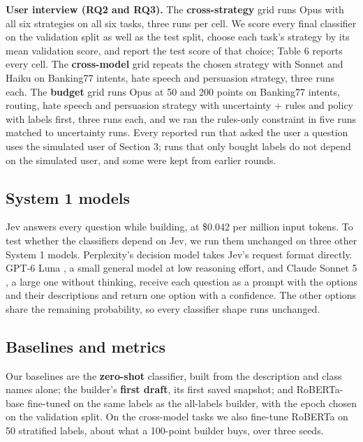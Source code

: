 \documentclass[11pt]{article}
\begin{document}
\textbf{User interview (RQ2 and RQ3).} The \textbf{cross-strategy} grid runs Opus with all six strategies on all six tasks, three runs per cell. We score every final classifier on the validation split as well as the test split, choose each task's strategy by its mean validation score, and report the test score of that choice; Table 6 reports every cell. The \textbf{cross-model} grid repeats the chosen strategy with Sonnet and Haiku on Banking77 intents, hate speech and persuasion strategy, three runs each. The \textbf{budget} grid runs Opus at 50 and 200 points on Banking77 intents, routing, hate speech and persuasion strategy with uncertainty + rules and policy with labels first, three runs each, and we ran the rules-only constraint in five runs matched to uncertainty runs. Every reported run that asked the user a question uses the simulated user of Section 3; runs that only bought labels do not depend on the simulated user, and some were kept from earlier rounds.

\subsection{System 1 models}

Jev answers every question while building, at \$0.042 per million input tokens. To test whether the classifiers depend on Jev, we run them unchanged on three other System 1 models. Perplexity's decision model \citep{perplexity2026} takes Jev's request format directly. GPT-6 Luna \citep{openai2026}, a small general model at low reasoning effort, and Claude Sonnet 5 \citep{anthropic2026}, a large one without thinking, receive each question as a prompt with the options and their descriptions and return one option with a confidence. The other options share the remaining probability, so every classifier shape runs unchanged.

\subsection{Baselines and metrics}

Our baselines are the \textbf{zero-shot} classifier, built from the description and class names alone; the builder's \textbf{first draft}, its first saved snapshot; and RoBERTa-base \citep{liu2019roberta} fine-tuned on the same labels as the all-labels builder, with the epoch chosen on the validation split. On the cross-model tasks we also fine-tune RoBERTa on 50 stratified labels, about what a 100-point builder buys, over three seeds.
\end{document}

